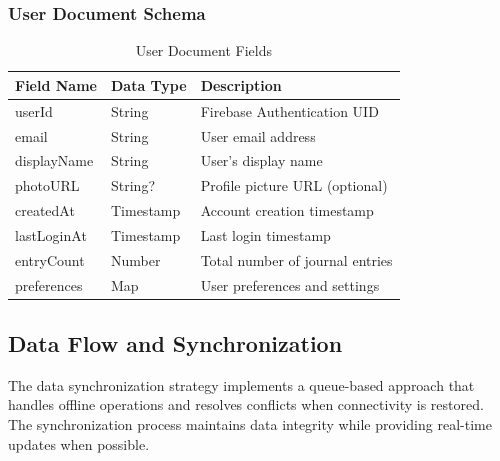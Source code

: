 \subsubsection{User Document Schema}

\begin{table}[H]
\centering
\caption{User Document Fields}
\label{tab:user-document}
\begin{tabular}{|p{3cm}|p{2cm}|p{8cm}|}
\hline
\textbf{Field Name} & \textbf{Data Type} & \textbf{Description} \\
\hline
userId & String & Firebase Authentication UID \\
\hline
email & String & User email address \\
\hline
displayName & String & User's display name \\
\hline
photoURL & String? & Profile picture URL (optional) \\
\hline
createdAt & Timestamp & Account creation timestamp \\
\hline
lastLoginAt & Timestamp & Last login timestamp \\
\hline
entryCount & Number & Total number of journal entries \\
\hline
preferences & Map & User preferences and settings \\
\hline
\end{tabular}
\end{table}

\subsection{Data Flow and Synchronization}\label{subsec:data-sync}

The data synchronization strategy implements a queue-based approach that handles offline operations and resolves conflicts when connectivity is restored. The synchronization process maintains data integrity while providing real-time updates when possible.

